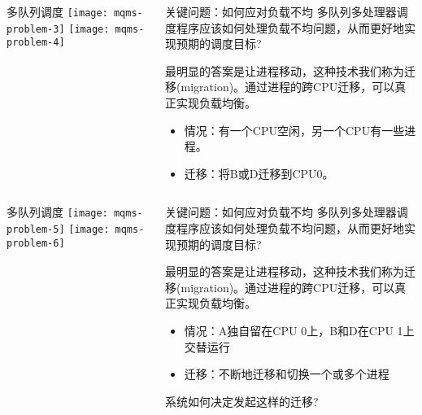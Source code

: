 \begin{frame}
	\begin{columns}
		\begin{column}{.5\textwidth}
			\Large \centering
			多队列调度
			\texttt{[image: mqms-problem-3]}
			\texttt{[image: mqms-problem-4]}	
		\end{column}
		
		\begin{column}{.5\textwidth}
			\begin{block}{关键问题：如何应对负载不均}
			多队列多处理器调度程序应该如何处理负载不均问题，从而更好地实现预期的调度目标?
			\end{block} 
			\normalsize
			最明显的答案是让进程移动，这种技术我们称为迁移(migration)。通过进程的跨CPU迁移，可以真正实现负载均衡。
			
			\begin{itemize}
				\item 情况：有一个CPU空闲，另一个CPU有一些进程。
				\item 迁移：将B或D迁移到CPU0。
		
			\end{itemize}
			\Large

		\end{column}
	\end{columns}
\end{frame}



\begin{frame}
	\begin{columns}
		\begin{column}{.5\textwidth}
			\Large \centering
			多队列调度
			\texttt{[image: mqms-problem-5]}
			\texttt{[image: mqms-problem-6]}	
		\end{column}
		
		\begin{column}{.5\textwidth}
			\begin{block}{关键问题：如何应对负载不均}
				多队列多处理器调度程序应该如何处理负载不均问题，从而更好地实现预期的调度目标?
			\end{block} 
			最明显的答案是让进程移动，这种技术我们称为迁移(migration)。通过进程的跨CPU迁移，可以真正实现负载均衡。
			
			\begin{itemize}
				\item 情况：A独自留在CPU 0上，B和D在CPU 1上交替运行
				\item 迁移：不断地迁移和切换一个或多个进程

			\end{itemize}
		\large
		系统如何决定发起这样的迁移?
			\Large
			
		\end{column}
	\end{columns}
\end{frame}



